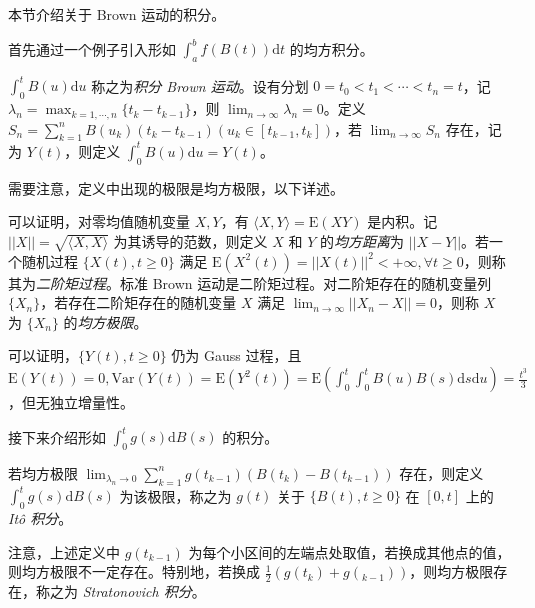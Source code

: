 \documentclass[../main.tex]{subfiles}
\begin{document}
本节介绍关于 Brown 运动的积分。

首先通过一个例子引入形如 $\int_a^bf(B(t))\mathrm dt$ 的均方积分。

\begin{example}
    $\int_0^tB(u)\mathrm du$ 称之为\emph{积分 Brown 运动}。设有分划 $0=t_0<t_1<\cdots<t_n=t$，记 $\lambda_n=\max_{k=1,\cdots,n}\{t_k-t_{k-1}\}$，则 $\lim_{n\rightarrow\infty}\lambda_n=0$。定义 $S_n=\sum_{k=1}^nB(u_k)(t_k-t_{k-1})(u_k\in[t_{k-1},t_k])$，若 $\lim_{n\rightarrow\infty}S_n$ 存在，记为 $Y(t)$，则定义 $\int_0^tB(u)\mathrm du=Y(t)$。
\end{example}

需要注意，定义中出现的极限是均方极限，以下详述。

\begin{definition}\label{def:8.5.1}
    可以证明，对零均值随机变量 $X,Y$，有 $\langle X,Y\rangle=\mathrm E(XY)$ 是内积。记 $||X||=\sqrt{\langle X,X\rangle}$ 为其诱导的范数，则定义 $X$ 和 $Y$ 的\emph{均方距离}为 $||X-Y||$。若一个随机过程 $\{X(t),t\geq0\}$ 满足 $\mathrm E(X^2(t))=||X(t)||^2<+\infty,\forall t\geq0$，则称其为\emph{二阶矩过程}。标准 Brown 运动是二阶矩过程。对二阶矩存在的随机变量列 $\{X_n\}$，若存在二阶矩存在的随机变量 $X$ 满足 $\lim_{n\rightarrow\infty}||X_n-X||=0$，则称 $X$ 为 $\{X_n\}$ 的\emph{均方极限}。
\end{definition}

可以证明，$\{Y(t),t\geq0\}$ 仍为 Gauss 过程，且 $\mathrm E(Y(t))=0,\mathrm{Var}(Y(t))=\mathrm E(Y^2(t))=\mathrm E(\int_0^t\int_0^tB(u)B(s)\mathrm ds\mathrm du)=\frac{t^3}3$，但无独立增量性。

接下来介绍形如 $\int_0^tg(s)\mathrm dB(s)$ 的积分。

\begin{definition}\label{def:8.5.2}
    若均方极限 $\lim_{\lambda_n\rightarrow0}\sum_{k=1}^ng(t_{k-1})(B(t_k)-B(t_{k-1}))$ 存在，则定义 $\int_0^tg(s)\mathrm dB(s)$ 为该极限，称之为 $g(t)$ 关于 $\{B(t),t\geq0\}$ 在 $[0,t]$ 上的 \emph{It\^o 积分}。
\end{definition}

注意，上述定义中 $g(t_{k-1})$ 为每个小区间的左端点处取值，若换成其他点的值，则均方极限不一定存在。特别地，若换成 $\frac12(g(t_k)+g(_{k-1}))$，则均方极限存在，称之为 \emph{Stratonovich 积分}。
\end{document}
